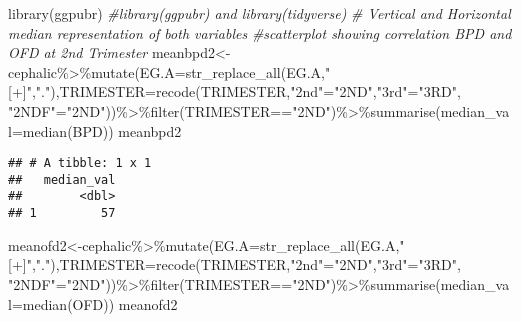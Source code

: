 \documentclass[
]{article}
\newenvironment{Shaded}{\begin{snugshade}}{\end{snugshade}}
\newcommand{\AttributeTok}[1]{\textcolor[rgb]{0.77,0.63,0.00}{#1}}
\newcommand{\CommentTok}[1]{\textcolor[rgb]{0.56,0.35,0.01}{\textit{#1}}}
\newcommand{\FunctionTok}[1]{\textcolor[rgb]{0.00,0.00,0.00}{#1}}
\newcommand{\NormalTok}[1]{#1}
\newcommand{\OtherTok}[1]{\textcolor[rgb]{0.56,0.35,0.01}{#1}}
\newcommand{\SpecialCharTok}[1]{\textcolor[rgb]{0.00,0.00,0.00}{#1}}
\newcommand{\StringTok}[1]{\textcolor[rgb]{0.31,0.60,0.02}{#1}}
\begin{document}
\begin{Shaded}
\begin{Highlighting}[]
\FunctionTok{library}\NormalTok{(ggpubr)}
\CommentTok{\#library(ggpubr) and library(tidyverse)}
\CommentTok{\# Vertical and Horizontal median representation of both variables}
\CommentTok{\#scatterplot showing correlation BPD and OFD at 2nd Trimester}
\NormalTok{meanbpd2}\OtherTok{\textless{}{-}}\NormalTok{cephalic}\SpecialCharTok{\%\textgreater{}\%}\FunctionTok{mutate}\NormalTok{(}\AttributeTok{EG.A=}\FunctionTok{str\_replace\_all}\NormalTok{(EG.A,}\StringTok{"[+]"}\NormalTok{,}\StringTok{"."}\NormalTok{),}\AttributeTok{TRIMESTER=}\FunctionTok{recode}\NormalTok{(TRIMESTER,}\StringTok{"2nd"}\OtherTok{=}\StringTok{"2ND"}\NormalTok{,}\StringTok{"3rd"}\OtherTok{=}\StringTok{"3RD"}\NormalTok{,}
  \StringTok{"2NDF"}\OtherTok{=}\StringTok{"2ND"}\NormalTok{))}\SpecialCharTok{\%\textgreater{}\%}\FunctionTok{filter}\NormalTok{(TRIMESTER}\SpecialCharTok{==}\StringTok{"2ND"}\NormalTok{)}\SpecialCharTok{\%\textgreater{}\%}\FunctionTok{summarise}\NormalTok{(}\AttributeTok{median\_val=}\FunctionTok{median}\NormalTok{(BPD))}
\NormalTok{meanbpd2}
\end{Highlighting}
\end{Shaded}

\begin{verbatim}
## # A tibble: 1 x 1
##   median_val
##        <dbl>
## 1         57
\end{verbatim}

\begin{Shaded}
\begin{Highlighting}[]
\NormalTok{meanofd2}\OtherTok{\textless{}{-}}\NormalTok{cephalic}\SpecialCharTok{\%\textgreater{}\%}\FunctionTok{mutate}\NormalTok{(}\AttributeTok{EG.A=}\FunctionTok{str\_replace\_all}\NormalTok{(EG.A,}\StringTok{"[+]"}\NormalTok{,}\StringTok{"."}\NormalTok{),}\AttributeTok{TRIMESTER=}\FunctionTok{recode}\NormalTok{(TRIMESTER,}\StringTok{"2nd"}\OtherTok{=}\StringTok{"2ND"}\NormalTok{,}\StringTok{"3rd"}\OtherTok{=}\StringTok{"3RD"}\NormalTok{,}
\StringTok{"2NDF"}\OtherTok{=}\StringTok{"2ND"}\NormalTok{))}\SpecialCharTok{\%\textgreater{}\%}\FunctionTok{filter}\NormalTok{(TRIMESTER}\SpecialCharTok{==}\StringTok{"2ND"}\NormalTok{)}\SpecialCharTok{\%\textgreater{}\%}\FunctionTok{summarise}\NormalTok{(}\AttributeTok{median\_val=}\FunctionTok{median}\NormalTok{(OFD))}
\NormalTok{meanofd2}
\end{Highlighting}
\end{Shaded}
\end{document}
